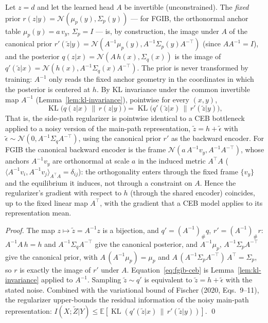 \begin{proposition}\label{prop:fgib-ceb}
Let $z = d$ and let the learned head $A$ be invertible (unconstrained). The \emph{fixed}
prior $r(z|y) = \mathcal{N}(\mu_p(y), \Sigma_p(y))$ --- for FGIB, the orthonormal anchor
table $\mu_p(y) = a\,v_y$, $\Sigma_p = I$ --- is, by construction, the image under $A$
of the canonical prior
$r'(\tilde{z}|y) = \mathcal{N}(A^{-1}\mu_p(y), A^{-1}\Sigma_p(y) A^{-\top})$
(since $A A^{-1} = I$), and the posterior $q(z|x) = \mathcal{N}(A\,h(x), \Sigma_q(x))$
is the image of
$q'(\tilde{z}|x) = \mathcal{N}(h(x), A^{-1}\Sigma_q(x) A^{-\top})$.
The prior is never transformed by training: $A^{-1}$ only reads the fixed anchor
geometry in the coordinates in which the posterior is centered at $h$.
By KL invariance under the common invertible map $A^{-1}$
(Lemma~\ref{lem:kl-invariance}), pointwise for every $(x, y)$,
\begin{equation}
\operatorname{KL}\big(q(z|x)\,\|\,r(z|y)\big)
= \operatorname{KL}\big(q'(\tilde{z}|x)\,\|\,r'(\tilde{z}|y)\big),
\label{eq:fgib-ceb}
\end{equation}
That is, the side-path regularizer is pointwise identical to a CEB bottleneck applied to
a noisy version of the main-path representation,
$\tilde{z} = h + \tilde{\epsilon}$ with
$\tilde{\epsilon} \sim \mathcal{N}(0, A^{-1}\Sigma_q A^{-\top})$,
using the canonical prior $r'$ as the backward encoder. For FGIB the canonical backward
encoder is the frame $\mathcal{N}(a\,A^{-1} v_y, A^{-1}A^{-\top})$, whose anchors
$A^{-1}v_y$ are orthonormal at scale $a$ in the induced metric $A^{\top}A$
($\langle A^{-1}v_i, A^{-1}v_j\rangle_{A^{\top}A} = \delta_{ij}$): the orthogonality
enters through the fixed frame $\{v_y\}$ and the equilibrium it induces, not through a
constraint on $A$.
Hence the regularizer's gradient with respect to $h$ (through the shared encoder)
coincides, up to the fixed linear map $A^{\top}$, with the gradient that a CEB model
applies to its representation mean.
\end{proposition}

\begin{proof}
The map $z \mapsto \tilde{z} = A^{-1}z$ is a bijection, and
$q' = (A^{-1})_\# q$, $r' = (A^{-1})_\# r$:
$A^{-1}A\,h = h$ and $A^{-1}\Sigma_q A^{-\top}$ give the canonical posterior, and
$A^{-1}\mu_p$, $A^{-1}\Sigma_p A^{-\top}$ give the canonical prior, with
$A\,(A^{-1}\mu_p) = \mu_p$ and $A\,(A^{-1}\Sigma_p A^{-\top})\,A^{\top} = \Sigma_p$, so
$r$ is exactly the image of $r'$ under $A$.
Equation~\eqref{eq:fgib-ceb} is Lemma~\ref{lem:kl-invariance} applied to $A^{-1}$.
Sampling $\tilde{z} \sim q'$ is equivalent to
$\tilde{z} = h + \tilde{\epsilon}$ with the stated noise.
Combined with the variational bound of Fischer (2020, Eqs.~9--11), the regularizer
upper-bounds the residual information of the noisy main-path representation:
$I(X;\tilde{Z}|Y) \le \mathbb{E}[\operatorname{KL}(q'(\tilde{z}|x)\,\|\,r'(\tilde{z}|y))]$.
\hfill\qed
\end{proof}

